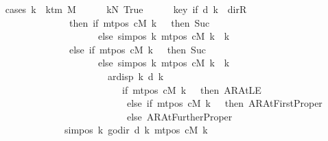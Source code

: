 \begin{isabellebody}
\ \ \isamarkupfalse%
\ {\isacharparenleft}{\kern0pt}cases\ {\isachardoublequoteopen}k\ {\isacharless}{\kern0pt}\ k{\isacharunderscore}{\kern0pt}tm\ M{\isachardoublequoteclose}{\isacharparenright}{\kern0pt}\isanewline
\ \ \ \ \isamarkupfalse%
\ kN{\isacharcolon}{\kern0pt}\ True\isanewline
\ \ \ \ \isamarkupfalse%
\ key{\isacharcolon}{\kern0pt}\ {\isachardoublequoteopen}{\isacharparenleft}{\kern0pt}if\ d\ k\ {\isacharequal}{\kern0pt}\ dir{\isachardot}{\kern0pt}R\isanewline
\ \ \ \ \ \ \ \ \ \ \ \ \ \ \ \ \ then\ {\isacharparenleft}{\kern0pt}if\ mt{\isacharunderscore}{\kern0pt}pos\ cM\ k\ {\isacharequal}{\kern0pt}\ {}\ then\ Suc\ {}\isanewline
\ \ \ \ \ \ \ \ \ \ \ \ \ \ \ \ \ \ \ \ \ \ \ else\ sim{\isacharunderscore}{\kern0pt}pos\ {\isacharquery}{\kern0pt}k\ {\isacharparenleft}{\kern0pt}mt{\isacharunderscore}{\kern0pt}pos\ cM\ k{\isacharparenright}{\kern0pt}\ {\isacharplus}{\kern0pt}\ {\isacharquery}{\kern0pt}k{\isacharparenright}{\kern0pt}\isanewline
\ \ \ \ \ \ \ \ \ \ \ \ \ \ \ \ \ else\ {\isacharparenleft}{\kern0pt}if\ mt{\isacharunderscore}{\kern0pt}pos\ cM\ k\ {\isacharequal}{\kern0pt}\ {}\ then\ Suc\ {}\isanewline
\ \ \ \ \ \ \ \ \ \ \ \ \ \ \ \ \ \ \ \ \ \ \ else\ sim{\isacharunderscore}{\kern0pt}pos\ {\isacharquery}{\kern0pt}k\ {\isacharparenleft}{\kern0pt}mt{\isacharunderscore}{\kern0pt}pos\ cM\ k{\isacharparenright}{\kern0pt}\ {\isacharplus}{\kern0pt}\ {\isacharquery}{\kern0pt}k{\isacharparenright}{\kern0pt}\isanewline
\ \ \ \ \ \ \ \ \ \ \ \ \ \ \ \ \ \ \ \ \ \ \ \ {\isacharminus}{\kern0pt}\ ar{\isacharunderscore}{\kern0pt}disp\ {\isacharquery}{\kern0pt}k\ {\isacharparenleft}{\kern0pt}d\ k{\isacharparenright}{\kern0pt}\isanewline
\ \ \ \ \ \ \ \ \ \ \ \ \ \ \ \ \ \ \ \ \ \ \ \ \ \ \ \ {\isacharparenleft}{\kern0pt}if\ mt{\isacharunderscore}{\kern0pt}pos\ cM\ k\ {\isacharequal}{\kern0pt}\ {}\ then\ AR{\isacharunderscore}{\kern0pt}AtLE\isanewline
\ \ \ \ \ \ \ \ \ \ \ \ \ \ \ \ \ \ \ \ \ \ \ \ \ \ \ \ \ else\ if\ mt{\isacharunderscore}{\kern0pt}pos\ cM\ k\ {\isacharequal}{\kern0pt}\ {}\ then\ AR{\isacharunderscore}{\kern0pt}AtFirstProper\isanewline
\ \ \ \ \ \ \ \ \ \ \ \ \ \ \ \ \ \ \ \ \ \ \ \ \ \ \ \ \ else\ AR{\isacharunderscore}{\kern0pt}AtFurtherProper{\isacharparenright}{\kern0pt}{\isacharparenright}{\kern0pt}\isanewline
\ \ \ \ \ \ \ \ \ \ \ \ \ \ \ {\isacharequal}{\kern0pt}\ sim{\isacharunderscore}{\kern0pt}pos\ {\isacharquery}{\kern0pt}k\ {\isacharparenleft}{\kern0pt}go{\isacharunderscore}{\kern0pt}dir\ {\isacharparenleft}{\kern0pt}d\ k{\isacharparenright}{\kern0pt}\ {\isacharparenleft}{\kern0pt}mt{\isacharunderscore}{\kern0pt}pos\ cM\ k{\isacharparenright}{\kern0pt}{\isacharparenright}{\kern0pt}{\isachardoublequoteclose}\isanewline

\end{isabellebody}
